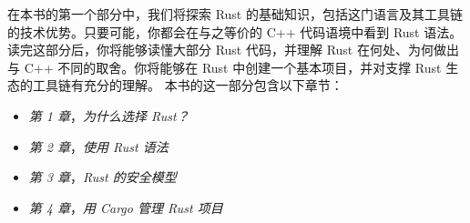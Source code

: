 在本书的第一个部分中，我们将探索 Rust 的基础知识，包括这门语言及其工具链的技术优势。只要可能，你都会在与之等价的 C++ 代码语境中看到 Rust 语法。读完这部分后，你将能够读懂大部分 Rust 代码，并理解 Rust 在何处、为何做出与 C++ 不同的取舍。你将能够在 Rust 中创建一个基本项目，并对支撑 Rust 生态的工具链有充分的理解。
本书的这一部分包含以下章节：
\begin{itemize}
  \item \emph{第 1 章}，\emph{为什么选择 Rust？}
  \item \emph{第 2 章}，\emph{使用 Rust 语法}
  \item \emph{第 3 章}，\emph{Rust 的安全模型}
  \item \emph{第 4 章}，\emph{用 Cargo 管理 Rust 项目}
\end{itemize}